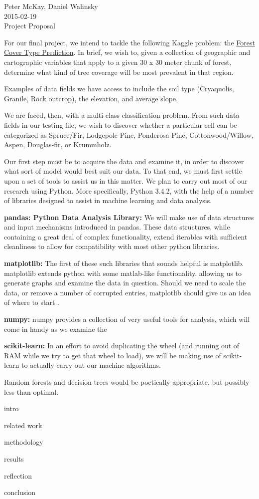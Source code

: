 \documentclass{article}
\begin{document}
\begin{center}
Peter McKay, Daniel Walinsky\\
2015-02-19\\
\Large Project Proposal
\end{center}

\bigskip
For our final project, we intend to tackle the following Kaggle problem:
the 
\href{http://www.kaggle.com/c/forest-cover-type-prediction}{Forest Cover Type Prediction}.
In brief, we wish to, given a collection of geographic and cartographic 
variables that apply to a given 30 x 30 meter chunk of forest, determine 
what kind of tree coverage will be most prevalent in that region.

Examples of data fields we have access to include the soil type 
(Cryaquolis, Granile, Rock outcrop), the elevation, and average slope.

We are faced, then, with a multi-class classification problem. From such 
data fields in our testing file, we wish to discover whether a 
particular cell can be categorized as
Spruce/Fir,
Lodgepole Pine,
Ponderosa Pine,
Cottonwood/Willow,
Aspen,
Douglas-fir, or
Krummholz.


Our first step must be to acquire the data and examine it, in order to 
discover what sort of model would best suit our data.  To that end, we 
must first settle upon a set of tools to assist us in this matter.  
We plan to carry out most of our research using Python.  More 
specifically, Python 3.4.2, with the help of a number of libraries designed 
to assist in machine learning and data analysis.  

\textbf{pandas: Python Data Analysis Library:}
We will make use of data structures and input mechanisms introduced in 
pandas.  These data structures, while containing a great deal of 
complex functionality, extend iterables with sufficient cleanliness to 
allow for compatibility with most other python libraries.

\textbf{matplotlib:} 
The first of these such libraries that sounds helpful is matplotlib.  
matplotlib extends python with some matlab-like functionality, allowing 
us to generate graphs and examine the data in question.  Should we need 
to scale the data, or remove a number of corrupted entries, matplotlib 
should give us an idea of where to start .

\textbf{numpy:}
numpy provides a collection of very useful tools for analysis, which 
will come in handy as we examine the 




\textbf{scikit-learn:}
In an effort to avoid duplicating the wheel (and running out of RAM 
while we try to get that wheel to load), we will be making use of 
scikit-learn to actually carry out our machine algorithms.

Random forests and 
decision trees would be poetically appropriate, but possibly less than 
optimal.

intro

related work

methodology






results

reflection

conclusion
\end{document}
